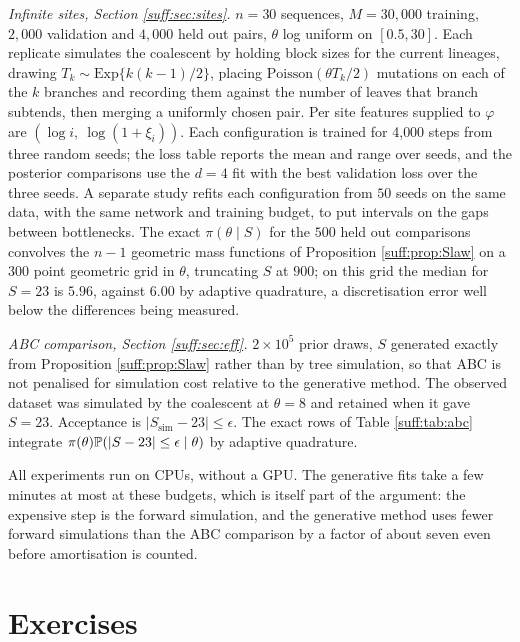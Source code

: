 \emph{Infinite sites, Section \ref{suff:sec:sites}.} $n=30$ sequences, $M=30{,}000$ training,
$2{,}000$ validation and $4{,}000$ held out pairs, $\theta$ log uniform on $[0.5,30]$. Each
replicate simulates the coalescent by holding block sizes for the current lineages, drawing
$T_k\sim\mathrm{Exp}\{k(k-1)/2\}$, placing $\mathrm{Poisson}(\theta T_k/2)$ mutations on each
of the $k$ branches and recording them against the number of leaves that branch subtends,
then merging a uniformly chosen pair. Per site features supplied to $\varphi$ are
$(\log i,\ \log(1+\xi_i))$. Each configuration is trained for 4{,}000 steps from three random
seeds; the loss table reports the mean and range over seeds, and the posterior comparisons use
the $d=4$ fit with the best validation loss over the three seeds. A separate study refits each configuration from $50$ seeds on the same data, with the same network and training budget, to put intervals on the gaps between bottlenecks. The exact $\pi(\theta\mid S)$ for the $500$ held out
comparisons convolves the $n-1$ geometric mass functions of Proposition \ref{suff:prop:Slaw}
on a $300$ point geometric grid in $\theta$, truncating $S$ at $900$; on this grid the median
for $S=23$ is $5.96$, against $6.00$ by adaptive quadrature, a discretisation error well below
the differences being measured.

\emph{ABC comparison, Section \ref{suff:sec:eff}.} $2\times10^5$ prior draws, $S$ generated
exactly from Proposition \ref{suff:prop:Slaw} rather than by tree simulation, so that ABC is not
penalised for simulation cost relative to the generative method. The observed dataset was
simulated by the coalescent at $\theta=8$ and retained when it gave $S=23$. Acceptance is
$|S_{\mathrm{sim}}-23|\le\epsilon$. The exact rows of Table \ref{suff:tab:abc} integrate
$\pi(\theta)\mathbb{P}(|S-23|\le\epsilon\mid\theta)$ by adaptive quadrature.

All experiments run on CPUs, without a GPU. The generative fits take a few
minutes at most at these budgets, which is itself part of the argument: the expensive step is
the forward simulation, and the generative method uses fewer forward simulations than the
ABC comparison by a factor of about seven even before amortisation is counted.

\section{Exercises}
\label{suff:sec:exercises}

